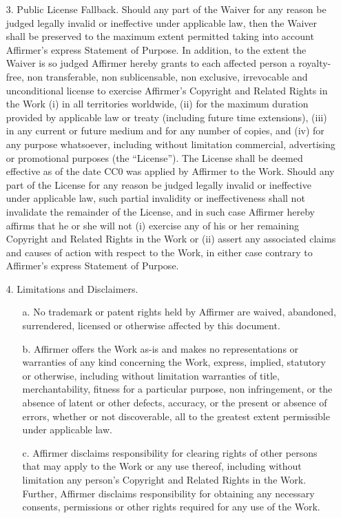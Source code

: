 \documentclass{tufte-book}
\begin{document}
\begin{fullwidth}
\begin{enumerate}
		\item[3.] Public License Fallback. Should any part of the Waiver for any reason be judged legally invalid or ineffective under applicable law, then the Waiver shall be preserved to the maximum extent permitted taking into account Affirmer's express Statement of Purpose. In addition, to the extent the Waiver is so judged Affirmer hereby grants to each affected person a royalty-free, non transferable, non sublicensable, non exclusive, irrevocable and unconditional license to exercise Affirmer's Copyright and Related Rights in the Work (i) in all territories worldwide, (ii) for the maximum duration provided by applicable law or treaty (including future time extensions), (iii) in any current or future medium and for any number of copies, and (iv) for any purpose whatsoever, including without limitation commercial, advertising or promotional purposes (the ``License''). The License shall be deemed effective as of the date CC$0$ was applied by Affirmer to the Work. Should any part of the License for any reason be judged legally invalid or ineffective under applicable law, such partial invalidity or ineffectiveness shall not invalidate the remainder of the License, and in such case Affirmer hereby affirms that he or she will not (i) exercise any of his or her remaining Copyright and Related Rights in the Work or (ii) assert any associated claims and causes of action with respect to the Work, in either case contrary to Affirmer's express Statement of Purpose.
		
		\item[4.] Limitations and Disclaimers.
			\begin{enumerate}
				\item[a.] No trademark or patent rights held by Affirmer are waived, abandoned, surrendered, licensed or otherwise affected by this document.
		
				\item[b.] Affirmer offers the Work as-is and makes no representations or warranties of any kind concerning the Work, express, implied, statutory or otherwise, including without limitation warranties of title, merchantability, fitness for a particular purpose, non infringement, or the absence of latent or other defects, accuracy, or the present or absence of errors, whether or not discoverable, all to the greatest extent permissible under applicable law.
		
				\item[c.] Affirmer disclaims responsibility for clearing rights of other persons that may apply to the Work or any use thereof, including without limitation any person's Copyright and Related Rights in the Work. Further, Affirmer disclaims responsibility for obtaining any necessary consents, permissions or other rights required for any use of the Work.
		

\end{enumerate}
\end{enumerate}
\end{fullwidth}
\end{document}
